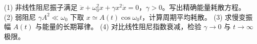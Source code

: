 (1) 非线性阻尼振子满足 \(\ddot x+\omega_0^2x+\gamma x^2\dot x=0\)，\(\gamma>0\)。写出精确能量耗散方程。
(2) 弱阻尼 \(\gamma A^2\ll\omega_0\) 下取 \(x\simeq A(t)\cos\omega_0t\)，计算周期平均耗散。
(3) 求慢变振幅 \(A(t)\) 与能量的长期幂律。
(4) 对比线性阻尼指数衰减，检验 \(\gamma\to0\) 与 \(t\to\infty\) 极限。
